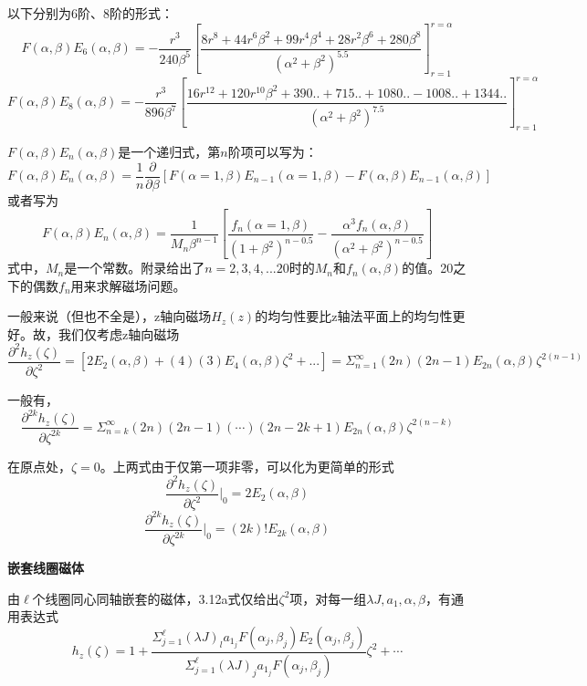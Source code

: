 以下分别为6阶、8阶的形式：
$$F(\alpha,\beta) E_6(\alpha,\beta)=-\frac{r^3}{240\beta^5}\left[\frac{8r^8+44 r^6\beta^2+99 r^4\beta^4+28 r^2 \beta^6+280 \beta^8}{(\alpha^2+\beta^2)^{5.5}}\right]_{r=1}^{r=\alpha}$$
$$F(\alpha,\beta) E_8(\alpha,\beta)=-\frac{r^3}{896\beta^7}\left[\frac{16 r^{12}+120 r^{10}\beta^2+390..+715..+1080..-1008..+1344..}{(\alpha^2+\beta^2)^{7.5}}\right]_{r=1}^{r=\alpha}$$


$F(\alpha,\beta) E_{n}(\alpha,\beta)$是一个递归式，第$n$阶项可以写为：
\begin{equation}
  F(\alpha,\beta) E_{n}(\alpha,\beta)=\frac{1}{n} \frac{\partial}{\partial \beta}\left[F(\alpha=1,\beta)E_{n-1}(\alpha=1,\beta)-F(\alpha,\beta)E_{n-1}(\alpha,\beta)\right]
\end{equation}
或者写为
$$ F(\alpha,\beta) E_{n}(\alpha,\beta)=\frac{1}{M_n \beta^{n-1}}\left[\frac{f_n(\alpha=1,\beta)}{(1+\beta^2)^{n-0.5}}-\frac{\alpha^3 f_n(\alpha,\beta)}{(\alpha^2+\beta^2)^{n-0.5}}\right]$$
式中，$M_n$是一个常数。附录给出了$n=2,3,4,...20$时的$M_n$和$f_n(\alpha,\beta)$的值。20之下的偶数$f_n$用来求解磁场问题。

一般来说（但也不全是），z轴向磁场$H_z(z)$的均匀性要比z轴法平面上的均匀性更好。故，我们仅考虑z轴向磁场
$$\frac{\partial^2 h_z(\zeta)}{\partial \zeta^2}=[2 E_2(\alpha,\beta)+(4)(3)E_4(\alpha,\beta)\zeta^2+...]=\Sigma_{n=1}^{\infty} (2n)(2n-1)E_{2n}(\alpha,\beta)\zeta^{2(n-1)}$$

一般有，
\begin{equation}
 \frac{\partial^{2k} h_z(\zeta)}{\partial \zeta^{2k}}=\Sigma_{n=k}^{\infty} (2n)(2n-1)(\cdots)(2n-2k+1)E_{2n}(\alpha,\beta)\zeta^{2(n-k)}
\end{equation}

在原点处，$\zeta=0$。上两式由于仅第一项非零，可以化为更简单的形式
$$\frac{\partial^2 h_z(\zeta)}{\partial \zeta^2}|_{0}=2 E_{2}(\alpha,\beta)$$
\begin{equation}
 \frac{\partial^{2k} h_z(\zeta)}{\partial \zeta^{2k}}|_{0}=(2k)! E_{2k}(\alpha,\beta)
 \end{equation}

\textbf{嵌套线圈磁体}

由$\ell$个线圈同心同轴嵌套的磁体，3.12a式仅给出$\zeta^2$项，对每一组$\lambda J, a_1, \alpha, \beta$，有通用表达式
\begin{equation}
  h_z(\zeta)=1+\frac{\Sigma_{j=1}^{\ell} (\lambda J)_l a_{1_j}F(\alpha_j,\beta_j)E_2(\alpha_j,\beta_j)}{\Sigma_{j=1}^{\ell}(\lambda J)_j a_{1_j} F(\alpha_j,\beta_j)}\zeta^2+\cdots
\end{equation}

